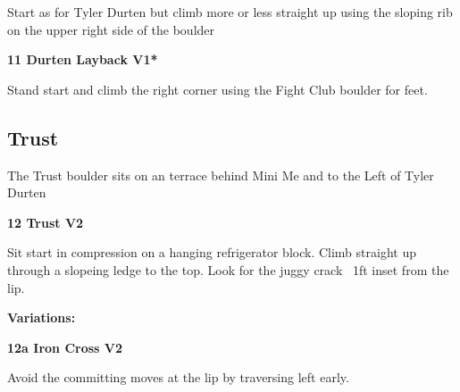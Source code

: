 \begin{multicols}{2}
			\begin{adjustwidth}{0.5cm}{}			
			Start as for Tyler Durten but climb more or less straight up using the sloping rib on the upper right side of the boulder
			\end{adjustwidth}
			
			
			
			\needspace{1.5cm}
\label{rt:Durten Layback}
\colorbox{green!20}{
\parbox{0.95\linewidth}{
\textbf{
11 Durten Layback V1*  
}}}

			\begin{adjustwidth}{0.5cm}{}			
			Stand start and climb the right corner using the Fight Club boulder for feet.
			\end{adjustwidth}
			
			
		
		
		\needspace{1.5cm}
		\subsection*{Trust}\label{bf:Trust}
		The Trust boulder sits on an terrace behind Mini Me and to the Left of Tyler Durten\\
	
		
			
			\needspace{1.5cm}
\label{rt:Trust}
\colorbox{green!20}{
\parbox{0.95\linewidth}{
\textbf{
12 Trust V2  
}}}

			\begin{adjustwidth}{0.5cm}{}			
			Sit start in compression on a hanging refrigerator block. Climb straight up through a slopeing ledge to the top. Look for the juggy crack ~1ft inset from the lip.
			\end{adjustwidth}
			
				\begin{adjustwidth}{0.5cm}{}				
				\needspace{3cm}
				\textbf{Variations:} \newline
					
					\needspace{1.5cm}
\label{vr:Iron Cross}
\colorbox{green!20}{
\parbox{0.95\linewidth}{
\textbf{
12a Iron Cross V2  
}}}

					\begin{adjustwidth}{0.5cm}{}			
					Avoid the committing moves at the lip by traversing left early.
					\end{adjustwidth}
					
					
				\end{adjustwidth}
			
		



\end{multicols}
